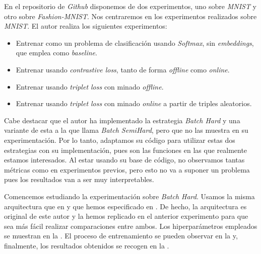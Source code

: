 En el repositorio de \textit{Github} \cite{informatica:adambielski_github} disponemos de dos experimentos, uno sobre \textit{MNIST} y otro sobre \textit{Fashion-MNIST}. Nos centraremos en los experimentos realizados sobre \textit{MNIST}. El autor realiza los siguientes experimentos:

\begin{itemize}
    \item Entrenar como un problema de clasificación usando \textit{Softmax}, sin \textit{embeddings}, que emplea como \textit{baseline}.
    \item Entrenar usando \textit{contrastive loss}, tanto de forma \textit{offline} como \textit{online}.
    \item Entrenar usando \textit{triplet loss} con minado \textit{offline}.
    \item Entrenar usando \textit{triplet loss} con minado \textit{online} a partir de triples aleatorios.
\end{itemize}

Cabe destacar que el autor ha implementado la estrategia \textit{Batch Hard} y una variante de esta a la que llama \textit{Batch SemiHard}, pero que no las muestra en su experimentación. Por lo tanto, adaptamos su código para utilizar estas dos estrategias con su implementación, pues son las funciones en las que realmente estamos interesados. Al estar usando su base de código, no observamos tantas métricas como en experimentos previos, pero esto no va a suponer un problema pues los resultados van a ser muy interpretables.

Comencemos estudiando la experimentación sobre \textit{Batch Hard}. Usamos la misma arquitectura que en  y que hemos especificado en . De hecho, la arquitectura es original de este autor y la hemos replicado en el anterior experimento para que sea más fácil realizar comparaciones entre ambos. Los hiperparámetros empleados se muestran en la . El proceso de entrenamiento se pueden observar en la  y, finalmente, los resultados obtenidos se recogen en la .

